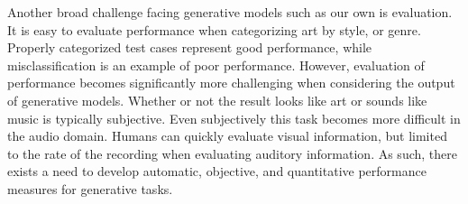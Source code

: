 \documentclass{article}
\begin{document}
Another broad challenge facing generative models such as our own is evaluation. It is easy to evaluate performance when categorizing art by style, or genre. Properly categorized test cases represent good performance, while misclassification is an example of poor performance. However, evaluation of performance becomes significantly more challenging when considering the output of generative models. Whether or not the result looks like art or sounds like music is typically subjective. Even subjectively this task becomes more difficult in the audio domain. Humans can quickly evaluate visual information, but limited to the rate of the recording when evaluating auditory information. As such, there exists a need to develop automatic, objective, and quantitative performance measures for generative tasks.


\end{document}
